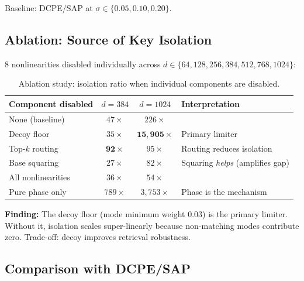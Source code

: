 \documentclass{article}
\begin{document}
Baseline: DCPE/SAP at $\sigma \in \{0.05, 0.10, 0.20\}$.

\subsection{Ablation: Source of Key Isolation}

8 nonlinearities disabled individually across $d \in \{64, 128, 256, 384, 512, 768, 1024\}$:

\begin{table}[htbp]
\centering
\caption{Ablation study: isolation ratio when individual components are disabled.}
\label{tab:ablation}
\begin{tabular}{@{}lccl@{}}
\toprule
\textbf{Component disabled} & $d{=}384$ & $d{=}1024$ & \textbf{Interpretation} \\
\midrule
None (baseline) & $47\times$ & $226\times$ & \\
Decoy floor & $35\times$ & $\mathbf{15{,}905\times}$ & Primary limiter \\
Top-$k$ routing & $\mathbf{92\times}$ & $95\times$ & Routing reduces isolation \\
Base squaring & $27\times$ & $82\times$ & Squaring \emph{helps} (amplifies gap) \\
All nonlinearities & $36\times$ & $54\times$ & \\
Pure phase only & $789\times$ & $3{,}753\times$ & Phase is the mechanism \\
\bottomrule
\end{tabular}
\end{table}

\textbf{Finding:} The decoy floor (mode minimum weight $0.03$) is the primary limiter.
Without it, isolation scales super-linearly because non-matching modes contribute zero.
Trade-off: decoy improves retrieval robustness.

\subsection{Comparison with DCPE/SAP}
\label{sec:dcpe-comparison}
\end{document}
